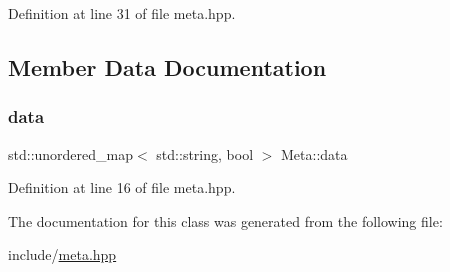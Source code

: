 Definition at line 31 of file meta.\+hpp.



\subsection{Member Data Documentation}
\mbox{\label{class_meta_af865c7f4162188f51a5f8489dd556be8}} 
\subsubsection{\texorpdfstring{data}{data}}
{\footnotesize\ttfamily std\+::unordered\+\_\+map$<$ std\+::string, bool $>$ Meta\+::data}



Definition at line 16 of file meta.\+hpp.



The documentation for this class was generated from the following file\+:\begin{DoxyCompactItemize}
\item 
include/\hyperlink{meta_8hpp}{meta.\+hpp}\end{DoxyCompactItemize}
